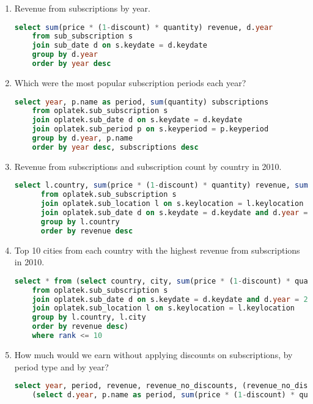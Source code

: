 \begin{enumerate}
  \item Revenue from subscriptions by year.
  \begin{lstlisting}[language=sql]
	select sum(price * (1-discount) * quantity) revenue, d.year 
	from sub_subscription s 
	join sub_date d on s.keydate = d.keydate 
	group by d.year 
	order by year desc
  \end{lstlisting}
  \item Which were the most popular subscription periods each year?
  \begin{lstlisting}[language=sql]
	select year, p.name as period, sum(quantity) subscriptions
	from oplatek.sub_subscription s 
	join oplatek.sub_date d on s.keydate = d.keydate
	join oplatek.sub_period p on s.keyperiod = p.keyperiod 
	group by d.year, p.name
	order by year desc, subscriptions desc
  \end{lstlisting}
  \item Revenue from subscriptions and subscription count by country in 2010.
  \begin{lstlisting}[language=sql]
	  select l.country, sum(price * (1-discount) * quantity) revenue, sum(quantity) subscriptions 
	  from oplatek.sub_subscription s 
	  join oplatek.sub_location l on s.keylocation = l.keylocation 
	  join oplatek.sub_date d on s.keydate = d.keydate and d.year = 2010
	  group by l.country 
	  order by revenue desc
  \end{lstlisting}
  \item Top 10 cities from each country with the highest revenue from subscriptions in 2010.
  \begin{lstlisting}[language=sql]  
	select * from (select country, city, sum(price * (1-discount) * quantity) revenue, rank() over(partition by country order by sum(price * (1-discount) * quantity) desc) rank 
	from oplatek.sub_subscription s 
	join oplatek.sub_date d on s.keydate = d.keydate and d.year = 2010
	join oplatek.sub_location l on s.keylocation = l.keylocation
	group by l.country, l.city
	order by revenue desc)
	where rank <= 10
  \end{lstlisting}
  \item How much would we earn without applying discounts on subscriptions, by period type and by year?
  \begin{lstlisting}[language=sql] 
  	select year, period, revenue, revenue_no_discounts, (revenue_no_discounts - revenue) difference from 
	(select d.year, p.name as period, sum(price * (1-discount) * quantity) revenue, sum(price * quantity) revenue_no_discounts

\end{lstlisting}
\end{enumerate}
